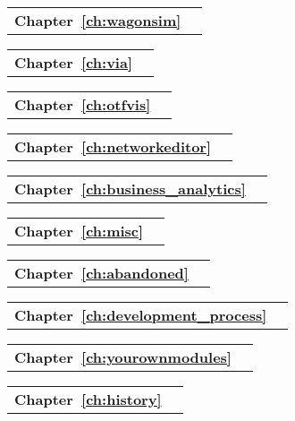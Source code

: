 \begin{tabular}[width=0.48\textwidth]{@{}l l}
\textbf{Chapter~\ref{ch:wagonsim}} &  \\
\end{tabular}

\begin{tabular}[width=0.48\textwidth]{@{}l l}
\textbf{Chapter~\ref{ch:via}} &  \\
\end{tabular}

\begin{tabular}[width=0.48\textwidth]{@{}l l}
\textbf{Chapter~\ref{ch:otfvis}} &  \\
\end{tabular}

\begin{tabular}[width=0.48\textwidth]{@{}l l}
\textbf{Chapter~\ref{ch:networkeditor}} &  \\
\end{tabular}

\begin{tabular}[width=0.48\textwidth]{@{}l l}
\textbf{Chapter~\ref{ch:business_analytics}} &  \\
\end{tabular}

\begin{tabular}[width=0.48\textwidth]{@{}l l}
\textbf{Chapter~\ref{ch:misc}} &  \\
\end{tabular}

\begin{tabular}[width=0.48\textwidth]{@{}l l}
\textbf{Chapter~\ref{ch:abandoned}} &  \\
\end{tabular}

\begin{tabular}[width=0.48\textwidth]{@{}l l}
\textbf{Chapter~\ref{ch:development_process}} &  \\
\end{tabular}

\begin{tabular}[width=0.48\textwidth]{@{}l l}
\textbf{Chapter~\ref{ch:yourownmodules}} &  \\
\end{tabular}

\begin{tabular}[width=0.48\textwidth]{@{}l l}
\textbf{Chapter~\ref{ch:history}} &  \\
\end{tabular}

